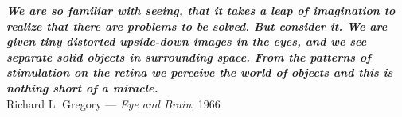 \thispagestyle{empty}
\hbox{} \vfill
\begin{flushright}
\small \textit{\textbf{We are so familiar with seeing, that it takes a leap of imagination to realize that there are problems to be solved. But consider it. We are given tiny distorted upside-down images in the eyes, and we see separate solid objects in surrounding space. From the patterns of stimulation on the retina we perceive the world of objects and this is nothing short of a miracle.}}
\\ \vspace{2mm}  
\scriptsize Richard L. Gregory — \textit{Eye and Brain}, 1966
\end{flushright}

\clearpage
\thispagestyle{empty}
\cleardoublepage